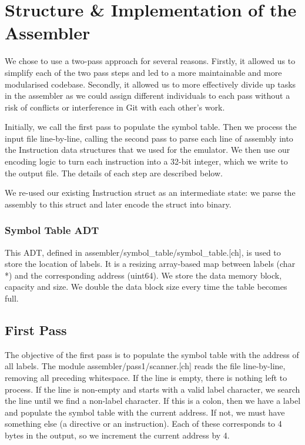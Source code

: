 \documentclass[11pt]{article}
\begin{document}
\section{Structure \& Implementation of the Assembler}
We chose to use a two-pass approach for several reasons. Firstly, it allowed us to simplify each of the two pass steps and led to a more maintainable and more modularised codebase. Secondly, it allowed us to more effectively divide up tasks in the assembler as we could assign different individuals to each pass without a risk of conflicts or interference in Git with each other's work.

Initially, we call the first pass to populate the symbol table. Then we process the input file line-by-line, calling the second pass to parse each line of assembly into the Instruction data structures that we used for the emulator. We then use our encoding logic to turn each instruction into a 32-bit integer, which we write to the output file. The details of each step are described below.

We re-used our existing Instruction struct as an intermediate state: we parse the assembly to this struct and later encode the struct into binary.

\subsubsection{Symbol Table ADT}

This ADT, defined in assembler/symbol\_table/symbol\_table.[ch], is used to store the location of labels. It is a resizing array-based map between labels (char *) and the corresponding address (uint64). We store the data memory block, capacity and size. We double the data block size every time the table becomes full.

\subsection{First Pass}

The objective of the first pass is to populate the symbol table with the address of all labels. The module assembler/pass1/scanner.[ch] reads the file line-by-line, removing all preceding whitespace. If the line is empty, there is nothing left to process. If the line is non-empty and starts with a valid label character, we search the line until we find a non-label character. If this is a colon, then we have a label and populate the symbol table with the current address. If not, we must have something else (a directive or an instruction). Each of these corresponds to 4 bytes in the output, so we increment the current address by 4.
\end{document}
